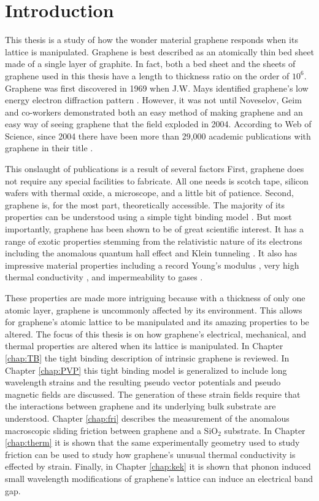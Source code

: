 \chapter{Introduction}

This thesis is a study of how the wonder material graphene responds when its lattice is manipulated.
Graphene is best described as an atomically thin bed sheet made of a single layer of graphite.
In fact, both a bed sheet and the sheets of graphene used in this thesis have a length to thickness ratio on the order of $10^6$.
Graphene was first discovered in 1969 when J.W. Mays identified graphene's low energy electron diffraction pattern \cite{May1969}. 
However, it was not until Noveselov, Geim and co-workers demonstrated both an easy method of making graphene and an easy way of seeing graphene \cite{Novoselov2004} that the field exploded in 2004.
According to Web of Science, since 2004 there have been more than 29,000 academic publications with graphene in their title \cite{WoS}.

This onslaught of publications is a result of several factors
First, graphene does not require any special facilities to fabricate.
All one needs is scotch tape, silicon wafers with thermal oxide, a microscope, and a little bit of patience.
Second, graphene is, for the most part, theoretically accessible.
The majority of its properties can be understood using a simple tight binding model \cite{CastroNeto2009}.
But most importantly, graphene has been shown to be of great scientific interest.
It has a range of exotic properties stemming from the relativistic nature of its electrons including the anomalous quantum hall effect \cite{Zhang2005} and Klein tunneling \cite{Young2009}.
It also has impressive material properties including a record Young’s modulus \cite{Lee2008}, very high thermal conductivity \cite{Faugeras2010}, and impermeability to gases \cite{Bunch2008}.

These properties are made more intriguing because with a thickness of only one atomic layer, graphene is uncommonly affected by its environment.
This allows for graphene's atomic lattice to be manipulated and its amazing properties to be altered.
The focus of this thesis is on how graphene's electrical, mechanical, and thermal properties are altered when its lattice is manipulated.
In Chapter \ref{chap:TB} the tight binding description of intrinsic graphene is reviewed.
In Chapter \ref{chap:PVP} this tight binding model is generalized to include long wavelength strains and the resulting pseudo vector potentials and pseudo magnetic fields are discussed.
The generation of these strain fields require that the interactions between graphene and its underlying bulk substrate are understood.
Chapter \ref{chap:fri} describes the measurement of the anomalous macroscopic sliding friction between graphene and a SiO$_2$ substrate.
In Chapter \ref{chap:therm} it is shown that the same experimentally geometry used to study friction can be used to study how graphene's unusual thermal conductivity is effected by strain.
Finally, in Chapter \ref{chap:kek} it is shown that phonon induced small wavelength modifications of graphene's lattice can induce an electrical band gap.